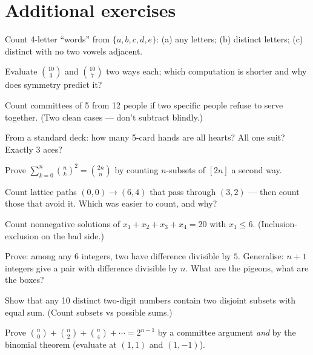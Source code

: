 \section{Additional exercises}
\begin{exercise}[easy]
Count 4-letter ``words'' from $\{a,b,c,d,e\}$: (a) any letters;
(b) distinct letters; (c) distinct with no two vowels adjacent.
\end{exercise}
\begin{exercise}[easy]
Evaluate $\binom{10}{3}$ and $\binom{10}{7}$ two ways each; which
computation is shorter and why does symmetry predict it?
\end{exercise}
\begin{exercise}[easy]
Count committees of 5 from 12 people if two specific people refuse to
serve together. (Two clean cases --- don't subtract blindly.)
\end{exercise}
\begin{exercise}[easy]
From a standard deck: how many 5-card hands are all hearts? All one
suit? Exactly 3 aces?
\end{exercise}
\begin{exercise}[medium]
Prove $\sum_{k=0}^{n} \binom{n}{k}^2 = \binom{2n}{n}$ by counting
$n$-subsets of $[2n]$ a second way.
\end{exercise}
\begin{exercise}[medium]
Count lattice paths $(0,0) \to (6,4)$ that pass through $(3,2)$ ---
then count those that avoid it. Which was easier to count, and why?
\end{exercise}
\begin{exercise}[medium]
Count nonnegative solutions of $x_1 + x_2 + x_3 + x_4 = 20$ with
$x_1 \le 6$. (Inclusion-exclusion on the bad side.)
\end{exercise}
\begin{exercise}[medium]
Prove: among any $6$ integers, two have difference divisible by $5$.
Generalise: $n+1$ integers give a pair with difference divisible by
$n$. What are the pigeons, what are the boxes?
\end{exercise}
\begin{exercise}[medium]
Show that any 10 distinct two-digit numbers contain two disjoint
subsets with equal sum. (Count subsets vs possible sums.)
\end{exercise}
\begin{exercise}[hard]
Prove $\binom{n}{0} + \binom{n}{2} + \binom{n}{4} + \cdots =
2^{n-1}$ by a committee argument \emph{and} by the binomial theorem
(evaluate at $(1,1)$ and $(1,-1)$).
\end{exercise}
